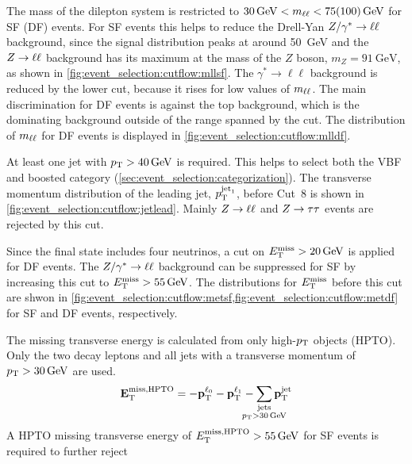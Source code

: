 \begin{description}[style=nextline,leftmargin=1cm]
    \item[\ \,(7) Dilepton mass]
        The mass of the dilepton system is restricted to $\SI{30}{\GeV} < \mll < \SI{75\,(100)}{\GeV}$ for SF (DF) events.
        For SF events this helps to reduce the Drell-Yan $Z / \gamma^* \to \ell \ell$ background, since the signal distribution peaks at around \SI{50}{\GeV}
        and the $Z \to \ell \ell$ background has its maximum at the mass of the $Z$ boson, $m_Z = \SI{91}{\GeV}$, as shown in \cref{fig:event_selection:cutflow:mllsf}.
        The $\gamma^* \to \ell\ell$ background is reduced by the lower cut, because it rises for low values of $m_{\ell\ell}$.
        The main discrimination for DF events is against the top background, which is the dominating background outside of the range spanned by the cut.
        The distribution of $m_{\ell\ell}$ for DF events is displayed in \cref{fig:event_selection:cutflow:mlldf}.
    \item[\ \,(8) Jet momentum]
        At least one jet with $\pt > \SI{40}{\GeV}$ is
        required.
        This helps to select both the VBF and boosted category (\cref{sec:event_selection:categorization}).
        The transverse momentum distribution of the leading jet, $p_\text{T}^{\text{jet}_1}$, before Cut~8 is shown in \cref{fig:event_selection:cutflow:jetlead}.
        Mainly $Z \to \ell \ell$ and $Z \to \tau \tau$ events are rejected by this cut.
    \item[\ \,(9) Missing transverse energy]
        Since the final state includes four neutrinos, a cut on $\etmiss > \SI{20}{\GeV}$ is applied for DF events.
        The $Z / \gamma^* \to \ell \ell$ background can be suppressed for SF by increasing this cut to $\etmiss > \SI{55}{\GeV}$.
        The distributions for $E_\text{T}^\text{miss}$ before this cut are shwon in \cref{fig:event_selection:cutflow:metsf,fig:event_selection:cutflow:metdf}
        for SF and DF events, respectively.
    \item[(10) Object based missing transverse energy (HPTO)]
        The missing transverse energy is calculated from only high-$p_\text{T}$ objects (HPTO). Only the two decay leptons and
        all jets with a transverse momentum of $\pt > \SI{30}{\GeV}$ are used.
        \begin{equation}
            \label{eq:met:hpto}
            \etmissvecobj{\text{HPTO}} = - \ptvec^{\ell_0} - \ptvec^{\ell_1} - \sum_{\mathclap{\substack{\text{jets} \\ \pt > \SI{30}{\GeV}}}} \ptvec^\text{jet}
        \end{equation}
        A HPTO missing transverse energy of $\etmisshpto > \SI{55}{\GeV}$ for SF events is required to further reject

\end{description}
